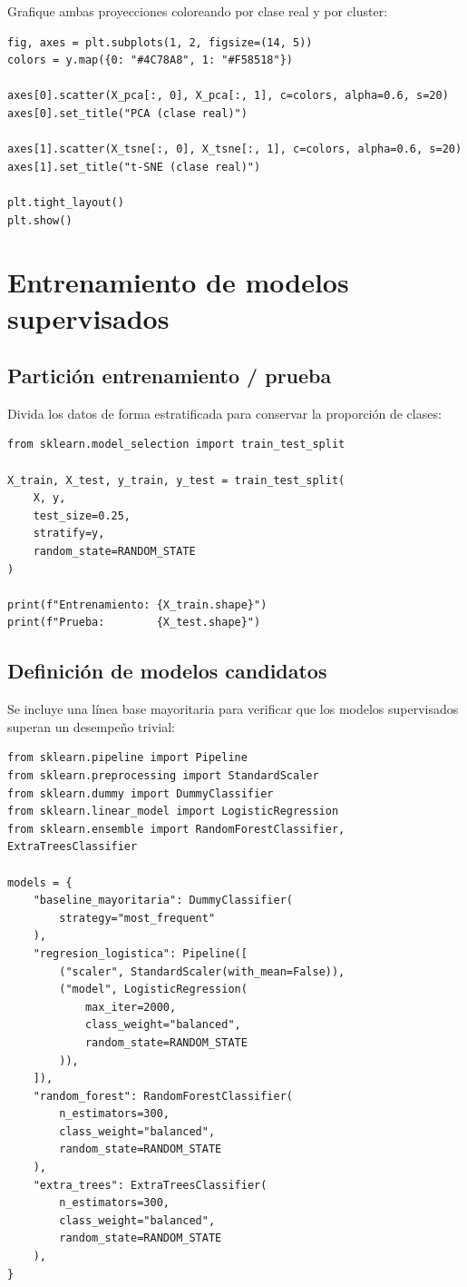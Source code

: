 \documentclass[
  coursetitle={Cómputo Nube y Tecnologías Emergentes},
  coursehours={96},
  coursedate={Verano 2026},
  doctype={Tutorial},
  otherlangs={english,french},
  authorname={Lázaro},
  authorsurname={Bustio-Martínez},
  authortitle={PhD},
  role={Profesor Investigador},
  email={lbustio@inaoe.mx},
  phone={5559504000},
  ext={7459},
  institution={Instituto Nacional de Astrofísica, Óptica y Electrónica (INAOE)},
  department={Maestría en Ciencias en Tecnologías de Seguridad},
  address={Luis Enrique Erro 1, Sta. Ma. Tonantzintla, San Andrés Cholula, CP 72840, Puebla, México},
  margin={0.5in}
]{../../lbustio_lecture_notes}
\begin{document}
Grafique ambas proyecciones coloreando por clase real y por cluster:

\begin{lstlisting}
fig, axes = plt.subplots(1, 2, figsize=(14, 5))
colors = y.map({0: "#4C78A8", 1: "#F58518"})

axes[0].scatter(X_pca[:, 0], X_pca[:, 1], c=colors, alpha=0.6, s=20)
axes[0].set_title("PCA (clase real)")

axes[1].scatter(X_tsne[:, 0], X_tsne[:, 1], c=colors, alpha=0.6, s=20)
axes[1].set_title("t-SNE (clase real)")

plt.tight_layout()
plt.show()
\end{lstlisting}

\section{Entrenamiento de modelos supervisados}

\subsection{Partición entrenamiento / prueba}

Divida los datos de forma estratificada para conservar la proporción de clases:

\begin{lstlisting}
from sklearn.model_selection import train_test_split

X_train, X_test, y_train, y_test = train_test_split(
    X, y,
    test_size=0.25,
    stratify=y,
    random_state=RANDOM_STATE
)

print(f"Entrenamiento: {X_train.shape}")
print(f"Prueba:        {X_test.shape}")
\end{lstlisting}

\subsection{Definición de modelos candidatos}

Se incluye una línea base mayoritaria para verificar que los modelos supervisados superan un desempeño trivial:

\begin{lstlisting}
from sklearn.pipeline import Pipeline
from sklearn.preprocessing import StandardScaler
from sklearn.dummy import DummyClassifier
from sklearn.linear_model import LogisticRegression
from sklearn.ensemble import RandomForestClassifier, ExtraTreesClassifier

models = {
    "baseline_mayoritaria": DummyClassifier(
        strategy="most_frequent"
    ),
    "regresion_logistica": Pipeline([
        ("scaler", StandardScaler(with_mean=False)),
        ("model", LogisticRegression(
            max_iter=2000,
            class_weight="balanced",
            random_state=RANDOM_STATE
        )),
    ]),
    "random_forest": RandomForestClassifier(
        n_estimators=300,
        class_weight="balanced",
        random_state=RANDOM_STATE
    ),
    "extra_trees": ExtraTreesClassifier(
        n_estimators=300,
        class_weight="balanced",
        random_state=RANDOM_STATE
    ),
}
\end{lstlisting}
\end{document}
